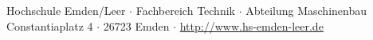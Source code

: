 \begin{titlepage}
    \vspace{0.5cm}
    \small
    \begin{center}
        Hochschule Emden/Leer $\cdot$ 
        Fachbereich Technik $\cdot$ 
        Abteilung Maschinenbau \\
        Constantiaplatz 4 $\cdot$ 
        26723 Emden $\cdot$ 
        \url{http://www.hs-emden-leer.de}
    \end{center}
    
\end{titlepage}

